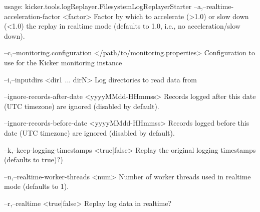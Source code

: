 usage: kicker.tools.logReplayer.FilesystemLogReplayerStarter
 --a,--realtime-acceleration-factor <factor>
        Factor by which to accelerate (>1.0) or slow down (<1.0) the
        replay in realtime mode (defaults to 1.0, i.e., no
        acceleration/slow down).

 --c,--monitoring.configuration </path/to/monitoring.properties>
        Configuration to use for the Kicker monitoring instance

 --i,--inputdirs <dir1 ... dirN>
        Log directories to read data from

    --ignore-records-after-date <yyyyMMdd-HHmmss>
        Records logged after this date (UTC timezone) are ignored
        (disabled by default).

    --ignore-records-before-date <yyyyMMdd-HHmmss>
        Records logged before this date (UTC timezone) are ignored
        (disabled by default).

 --k,--keep-logging-timestamps <true|false>
        Replay the original logging timestamps (defaults to true)?)

 --n,--realtime-worker-threads <num>
        Number of worker threads used in realtime mode (defaults to 1).

 --r,--realtime <true|false>
        Replay log data in realtime?
